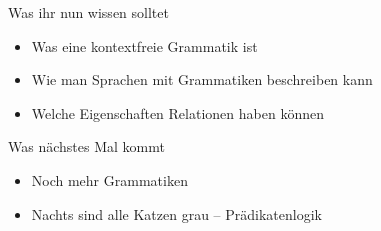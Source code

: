 \begin{frame}	
	\begin{block}{Was ihr nun wissen solltet}
		\begin{itemize}
			\item Was eine kontextfreie Grammatik ist
			\item Wie man Sprachen mit Grammatiken beschreiben kann
			\item Welche Eigenschaften Relationen haben können
		\end{itemize}
	\end{block}
	
	\begin{block}{Was nächstes Mal kommt}
		\begin{itemize}
			\item Noch mehr Grammatiken
			\item Nachts sind alle Katzen grau -- Prädikatenlogik
		\end{itemize}
	\end{block}
\end{frame}	


\slideThanks

